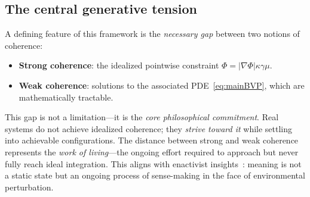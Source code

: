 \documentclass[11pt]{article}
\theoremstyle{plain}
\theoremstyle{definition}
\theoremstyle{remark}
\begin{document}
\subsection*{The central generative tension}
A defining feature of this framework is the \emph{necessary gap} between two notions of coherence:
\begin{itemize}[leftmargin=2em]
\item \textbf{Strong coherence}: the idealized pointwise constraint \(\Phi = |\nabla\Phi|\kappa\gamma\mu\).
\item \textbf{Weak coherence}: solutions to the associated PDE~\eqref{eq:mainBVP}, which are mathematically tractable.
\end{itemize}
This gap is not a limitation---it is the \emph{core philosophical commitment}. Real systems do not achieve idealized coherence; they \emph{strive toward it} while settling into achievable configurations. The distance between strong and weak coherence represents the \emph{work of living}---the ongoing effort required to approach but never fully reach ideal integration. This aligns with enactivist insights~\cite{Thompson2007}: meaning is not a static state but an ongoing process of sense-making in the face of environmental perturbation.
\end{document}
